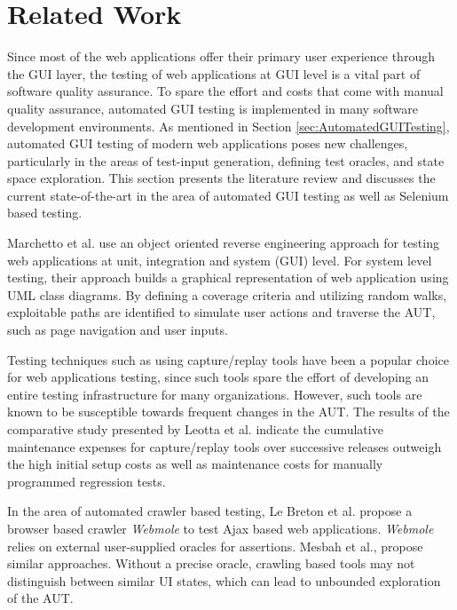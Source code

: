 \section{Related Work}
\label{sec:relatedWork}

Since most of the web applications offer their primary user experience through the GUI layer, the testing of web applications at GUI level is a vital part of software quality assurance. To spare the effort and costs that come with manual quality assurance, automated GUI testing is implemented in many software development environments. As mentioned in Section \ref{sec:AutomatedGUITesting}, automated GUI testing of modern web applications poses new challenges, particularly in the areas of test-input generation, defining test oracles, and state space exploration. This section presents the literature review and discusses the current state-of-the-art in the area of automated GUI testing as well as Selenium\cite{websiteSelenium} based testing. 

Marchetto et al.\cite{Marchetto2006} use an object oriented reverse engineering approach for testing web applications at unit, integration and system (GUI) level. For system level testing, their approach builds a graphical representation of web application using UML class diagrams. By defining a coverage criteria and utilizing random walks, exploitable paths are identified to simulate user actions and traverse the AUT, such as page navigation and user inputs.

Testing techniques such as using capture/replay tools have been a popular choice for web applications testing, since such tools spare the effort of developing an entire testing infrastructure for many organizations. However, such tools are known to be susceptible towards frequent changes in the AUT\cite{sjosten2006costs}. The results of the comparative study presented by Leotta et al.\cite{leotta2013capture} indicate the cumulative maintenance expenses for capture/replay tools over successive releases outweigh the high initial setup costs as well as maintenance costs for manually programmed regression tests. 

In the area of automated crawler based testing, Le Breton et al. \cite{le2013automated} propose a browser based crawler \textit{Webmole} to test Ajax based web applications. \textit{Webmole} relies on external user-supplied oracles for assertions. Mesbah et al.\cite{Crawljax},\cite{MesbahInvarient} propose similar approaches. Without a precise oracle, crawling based tools may not distinguish between similar UI states, which can lead to unbounded exploration of the AUT.

